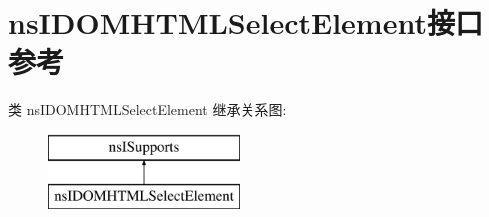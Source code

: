 \hypertarget{interfacens_i_d_o_m_h_t_m_l_select_element}{}\section{ns\+I\+D\+O\+M\+H\+T\+M\+L\+Select\+Element接口 参考}
\label{interfacens_i_d_o_m_h_t_m_l_select_element}
类 ns\+I\+D\+O\+M\+H\+T\+M\+L\+Select\+Element 继承关系图\+:\begin{figure}[H]
\begin{center}
\leavevmode
\includegraphics[height=2.000000cm]{interfacens_i_d_o_m_h_t_m_l_select_element}
\end{center}
\end{figure}
